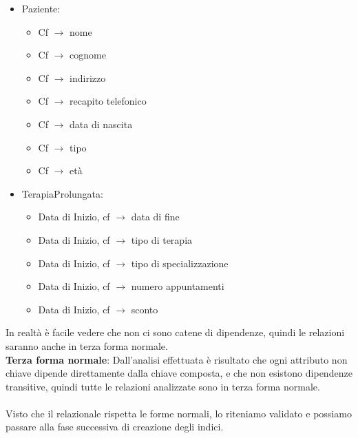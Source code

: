 \documentclass[11pt]{article}
\begin{document}
\begin{itemize}
    \item Paziente:
    \begin{itemize}
        \item Cf $\rightarrow$ nome
        \item Cf $\rightarrow$ cognome
        \item Cf $\rightarrow$ indirizzo
        \item Cf $\rightarrow$ recapito telefonico
        \item Cf $\rightarrow$ data di nascita
        \item Cf $\rightarrow$ tipo
        \item Cf $\rightarrow$ età
    \end{itemize}

    \item TerapiaProlungata:
    \begin{itemize}
        \item Data di Inizio, cf $\rightarrow$ data di fine
        \item Data di Inizio, cf $\rightarrow$ tipo di terapia
        \item Data di Inizio, cf $\rightarrow$ tipo di specializzazione
        \item Data di Inizio, cf $\rightarrow$ numero appuntamenti
        \item Data di Inizio, cf $\rightarrow$ sconto
    \end{itemize}
\end{itemize}

In realtà è facile vedere che non ci sono catene di dipendenze, quindi le relazioni saranno anche in terza forma normale.\\

\textbf{Terza forma normale}: Dall’analisi effettuata è risultato che ogni attributo non chiave dipende direttamente dalla chiave composta, 
e che non esistono dipendenze transitive, quindi tutte le relazioni analizzate sono in terza forma normale.\\
\\
Visto che il relazionale rispetta le forme normali, lo riteniamo validato e possiamo passare alla fase successiva di creazione degli indici.
\end{document}
